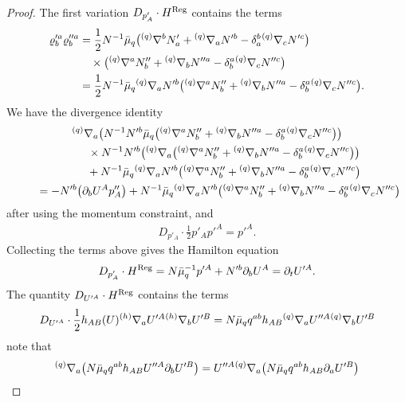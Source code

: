 \documentclass[pdftex]{sigma}
\def\ptl{\partial}%
\def\grad{{\nabla}}%
\newcommand{\leftexp}[2]{{\vphantom{#2}}^{#1}{#2}}
\def\halb{\frac{1}{2}}%
\numberwithin{equation}{section}
\begin{document}
\begin{proof}
The first variation $D_{p'_A} \cdot H^{{\rm Reg}}$ contains the terms
\begin{align*}
\varrho'^a_b \varrho''^a_b &{}= \halb N^{-1} \bar{\mu}_q \bigl(\leftexp{(q)}{\grad}^b N'_a + \leftexp{(q)}{\grad}_a N'^b - \delta_a^b \leftexp{(q)}{\grad}_c N'^c\bigr) \notag\\
&\quad{}{} \times \bigl(\leftexp{(q)}{\grad}^a N''_b + \leftexp{(q)}{\grad}_b N''^a - \delta_b^a \leftexp{(q)}{\grad}_c N''^c\bigr) \notag\\
&{}= \halb N^{-1} \bar{\mu}_q \leftexp{(q)}{\grad}_a N'^b \bigl(\leftexp{(q)}{\grad}^a N''_b + \leftexp{(q)}{\grad}_b N''^a - \delta_b^a \leftexp{(q)}{\grad}_c N''^c\bigr).
\end{align*}
We have the divergence identity
\begin{gather*}
 \leftexp{(q)}{\grad}_a \bigl(N^{-1} N'^b \bar{\mu}_q \bigl(\leftexp{(q)}{\grad}^a N''_b + \leftexp{(q)}{\grad}_b N''^a - \delta_b^a \leftexp{(q)}{\grad}_c N''^c\bigr)\bigr) \notag\\
\qquad\quad{}\times N^{-1} N'^b \bigl(\leftexp{(q)}{\grad}_a \bigl(\leftexp{(q)}{\grad}^a N''_b + \leftexp{(q)}{\grad}_b N''^a - \delta_b^a \leftexp{(q)}{\grad}_c N''^c\bigr)\bigr) \notag\\
\qquad\quad{}+ N^{-1} \bar{\mu}_q \leftexp{(q)}{\grad}_a N'^b \bigl(\leftexp{(q)}{\grad}^a N''_b + \leftexp{(q)}{\grad}_b N''^a - \delta_b^a \leftexp{(q)}{\grad}_c N''^c\bigr) \notag\\
\qquad{}= -N'^b \bigl(\ptl_b U^A p''_A\bigr) + N^{-1} \bar{\mu}_q \leftexp{(q)}{\grad}_a N'^b \bigl(\leftexp{(q)}{\grad}^a N''_b + \leftexp{(q)}{\grad}_b N''^a - \delta_b^a \leftexp{(q)}{\grad}_c N''^c\bigr)
\end{gather*}
after using the momentum constraint, and
\begin{align*}
D_{p'_A} \cdot \halb p'_A p'^A = p'^A.
\end{align*}
Collecting the terms above gives the Hamilton equation
\begin{align*}
D_{p'_A} \cdot H^{{\rm Reg}} = N \bar{\mu}^{-1}_q p'^A + N'^b \ptl_b U^A
= \ptl_t U'^A.
\end{align*}
The quantity $D_{U'^A} \cdot H^{{\rm Reg}}$ contains the terms
\[
D_{U'^A} \cdot \halb h_{AB}(U) \leftexp{(h)}{\grad}_a U'^A \leftexp{(h)}{\grad}_b U'^B = N \bar{\mu}_q q^{ab} h_{AB} \leftexp{(q)}{\grad}_a U''^A \leftexp{(q)}{\grad}_b U'^B \]
note that
\begin{align*}
\leftexp{(q)}{\grad}_a \bigl(N \bar{\mu}_q q^{ab} h_{AB} U''^A \ptl_b U'^B\bigr)&{}= U''^A \leftexp{(q)}{\grad}_a \bigl(N \bar{\mu}_q q^{ab} h_{AB} \ptl_a U'^B\bigr) \\

\end{align*}
\end{proof}
\end{document}
